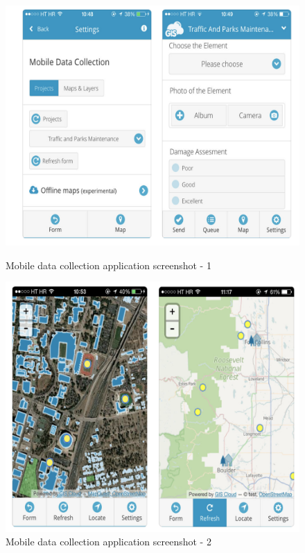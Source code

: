 \begin{itemize}
  \begin{figure}[!htb]
        \begin{minipage}{0.35\textwidth}
            \centering
            \includegraphics[width=1.0\linewidth]{figures/ch1/mobile_data_collection_1.png}
            \caption{Mobile data collection application screenshot - 1 \cite{GIS_cloud_mobile_data_collection}}\label{Fig:mobile_data_collection_1}
        \end{minipage}\hfill
        \begin{minipage}{0.35\textwidth}
            \centering
            \includegraphics[width=1.0\linewidth]{figures/ch1/mobile_data_collection_2.png}
            \caption{Mobile data collection application screenshot - 2 \cite{GIS_cloud_mobile_data_collection}}\label{Fig:mobile_data_collection_2}
        \end{minipage}
\end{figure}


\end{itemize}
